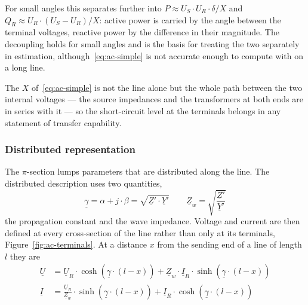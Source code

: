 For small angles this separates further into
$P \approx U_S \cdot U_R \cdot \delta / X$ and
$Q_R \approx U_R \cdot \left(U_S - U_R\right) / X$: active power is carried
by the angle between the terminal voltages, reactive power by the difference
in their magnitude. The decoupling holds for small angles and is the basis
for treating the two separately in estimation, although~\eqref{eq:ac-simple}
is not accurate enough to compute with on a long line.

The $X$ of~\eqref{eq:ac-simple} is not the line alone but the whole path
between the two internal voltages --- the source impedances and the
transformers at both ends are in series with it --- so the short-circuit
level at the terminals belongs in any statement of transfer capability.

\subsubsection{Distributed representation}
\label{sec:ac-wave}

The $\pi$-section lumps parameters that are distributed along the line. The distributed description uses two quantities,
\begin{equation}
  \underline{\gamma} = \alpha + j \cdot \beta
    = \sqrt{\underline{Z}' \cdot \underline{Y}'}
  \qquad
  \underline{Z}_w = \sqrt{\frac{\underline{Z}'}{\underline{Y}'}}
  \label{eq:ac-gamma-zw}
\end{equation}
the propagation constant and the wave impedance. Voltage and current are
then defined at every cross-section of the line rather than only at its
terminals, Figure~\ref{fig:ac-terminals}. At a distance $x$ from the
sending end of a line of length $l$ they are
\begin{align}
  \underline{U} &= \underline{U}_R \cdot
      \cosh\left(\underline{\gamma} \cdot \left(l-x\right)\right)
    + \underline{Z}_w \cdot \underline{I}_R \cdot
      \sinh\left(\underline{\gamma} \cdot \left(l-x\right)\right)
  \label{eq:ac-u-x} \\[0.3em]
  \underline{I} &= \frac{\underline{U}_R}{\underline{Z}_w} \cdot
      \sinh\left(\underline{\gamma} \cdot \left(l-x\right)\right)
    + \underline{I}_R \cdot
      \cosh\left(\underline{\gamma} \cdot \left(l-x\right)\right)
  \label{eq:ac-i-x}
\end{align}

